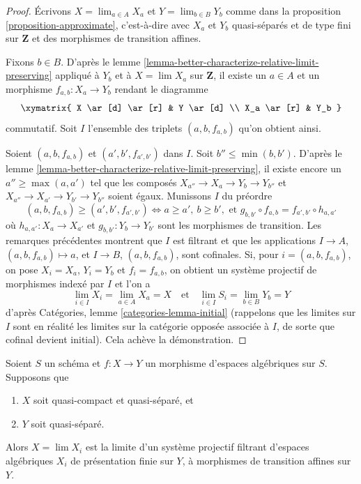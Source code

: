 \begin{proof}
Écrivons $X = \lim_{a \in A} X_a$ et $Y = \lim_{b \in B} Y_b$ comme dans la
proposition \ref{proposition-approximate}, c'est-à-dire avec $X_a$ et $Y_b$
quasi-séparés et de type fini sur $\mathbf{Z}$ et
des morphismes de transition affines.

\medskip\noindent
Fixons $b \in B$.
D'après le lemme \ref{lemma-better-characterize-relative-limit-preserving}
appliqué à $Y_b$ et à $X = \lim X_a$ sur $\mathbf{Z}$,
il existe un $a \in A$ et un morphisme
$f_{a, b} : X_a \to Y_b$ rendant le diagramme
$$
\xymatrix{
X \ar[d] \ar[r] & Y \ar[d] \\
X_a \ar[r] & Y_b
}
$$
commutatif. Soit $I$ l'ensemble des triplets $(a, b, f_{a, b})$ qu'on
obtient ainsi.

\medskip\noindent
Soient $(a, b, f_{a, b})$ et $(a', b', f_{a', b'})$ dans $I$.
Soit $b'' \leq \min(b, b')$. D'après le
lemme \ref{lemma-better-characterize-relative-limit-preserving},
il existe encore un $a'' \geq \max(a, a')$ tel que
les composés $X_{a''} \to X_a \to Y_b \to Y_{b''}$ et
$X_{a''} \to X_{a'} \to Y_{b'} \to Y_{b''}$ soient égaux.
Munissons $I$ du préordre
$$
(a, b, f_{a, b}) \geq (a', b', f_{a', b'})
\Leftrightarrow
a \geq a',\ b \geq b',\text{ et }
g_{b, b'} \circ f_{a, b} = f_{a', b'} \circ h_{a, a'}
$$
où $h_{a, a'} : X_a \to X_{a'}$ et $g_{b, b'} : Y_b \to Y_{b'}$
sont les morphismes de transition. Les remarques précédentes montrent que $I$
est filtrant et que les applications $I \to A$, $(a, b, f_{a, b}) \mapsto a$,
et $I \to B$, $(a, b, f_{a, b})$, sont cofinales. Si, pour $i = (a, b, f_{a, b})$,
on pose $X_i = X_a$, $Y_i = Y_b$ et $f_i = f_{a, b}$, on obtient
un système projectif de morphismes indexé par $I$ et l'on a
$$
\lim_{i \in I} X_i = \lim_{a \in A} X_a = X
\quad\text{et}\quad
\lim_{i \in I} S_i = \lim_{b \in B} Y_b = Y
$$
d'après Catégories, lemme \ref{categories-lemma-initial} (rappelons que
les limites sur $I$ sont en réalité les limites sur la catégorie opposée
associée à $I$, de sorte que cofinal devient initial).
Cela achève la démonstration.
\end{proof}

\begin{lemma}
\label{lemma-relative-approximation}
Soient $S$ un schéma et $f : X \to Y$ un morphisme d'espaces algébriques
sur $S$. Supposons que
\begin{enumerate}
\item $X$ soit quasi-compact et quasi-séparé, et
\item $Y$ soit quasi-séparé.
\end{enumerate}
Alors $X = \lim X_i$ est la limite d'un système projectif filtrant d'espaces algébriques
$X_i$ de présentation finie sur $Y$, à morphismes de transition affines
sur $Y$.
\end{lemma}

